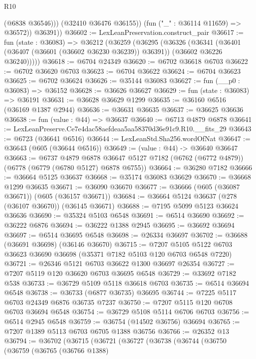 \begin{lexlean}{R10}
\begin{coremodule}
                (@6838 @36546)))
            (@32410 @36476 @36155))
          (fun ("_" : @36114 @11659) => @36572))
        @36391))
@36602 := LexLeanPreservation.construct_pair
@36617 := fun (state : @36083) =>
  @36212
    (@36259
      (@36295
        (@36326
          (@36341
            (@36401 (@36407 (@36601 (@36602 @36230 @36239)) @36391))
            (@36602 @36226 @36240)))))
@36618 := @6704 @24349
@36620 := @6702 @36618 @6703
@36622 := @6702 @36620 @6703
@36623 := @6704 @36622
@36624 := @6704 @36623
@36625 := @6702 @36624
@36626 := @35144 @36083
@36627 := fun (__p0 : @36083) => @36152
@36628 := @36626 @36627
@36629 := fun (state : @36083) => @36191
@36631 := @36628 @36629 @1299
@36635 := @36160 @6516 (@36169 @1387 @2944)
@36636 := @36631 @36635
@36637 := @36625 @36636
@36638 := fun (value : @44) => @36637
@36640 := @6713 @4879 @6878
@36641 := LexLeanPreserve.Ce7e4dac58aefdeaa5aa58370d36e91c9.R10.__fits_29
@36643 := @6723 (@36641 @6516)
@36644 := LexLeanStd.Sha256.wordOfNat
@36647 := @36643 (@605 (@36644 @6516))
@36649 := (value : @44) -> @36640 @36647
@36663 := @6737
    @4879
    @6878
    @36647
    @5127
    @7182
    (@6762 (@6772 @4879))
    (@6778 (@6779 (@6780 @5127) @6878 @6755))
@36664 := @36280 @7182
@36666 := @36664 @5125 @36637
@36668 := @35174 @36083 @36629
@36670 := @36668 @1299 @36635
@36671 := @36090 @36670
@36677 := @36666 (@605 (@36087 @36671)) (@605 (@36157 @36671))
@36684 := @36664 @5124 @36637 (@278 (@36107 @36670)) (@36145 @36671)
@36688 := @7195 @5099 @5123 @36624 @36636
@36690 := @35324 @5103 @6548
@36691 := @6514 @36690
@36692 := @36222 @6876
@36694 := @36222 @1388 @2945
@36695 := @36692 @36694
@36697 := @6514 @36695 @6548
@36698 := @26334 @36697
@36702 := @36688 (@36691 @36698) (@36146 @36670)
@36715 := @7207 @5105 @5122 @6703 @36623 @36690 @36698 (@35371 @7182 @5103 @120 @6703 @6548 @7220)
@36721 := @26346 @5121 @6703 @36622 @1300 @36697 @26354
@36727 := @7207 @5119 @120 @36620 @6703 @36695 @6548
@36729 := @33692 @7182 @538
@36733 := @36729 @5109 @5118 @36618 @6703
@36735 := @6514 @36694 @6548
@36738 := @36733 (@6877 @36735) @36695
@36744 := @7225 @5117 @6703 @24349 @6876 @36735 @7237
@36750 := @7207 @5115 @120 @6708 @6703 @36694 @6548
@36754 := @36729 @5108 @5114 @6706 @6703
@36756 := @6514 @2945 @6548
@36759 := @36754 (@14502 @36756) @36694
@36765 := @7207 @1389 @5113 @6703 @6705 @1388 @36756
@36766 := @26352 @13
@36794 := @36702
    (@36715
      (@36721
        (@36727
          (@36738
            (@36744
              (@36750
                (@36759
                  (@36765
                    (@36766 @1388)

\end{coremodule}
\end{lexlean}
